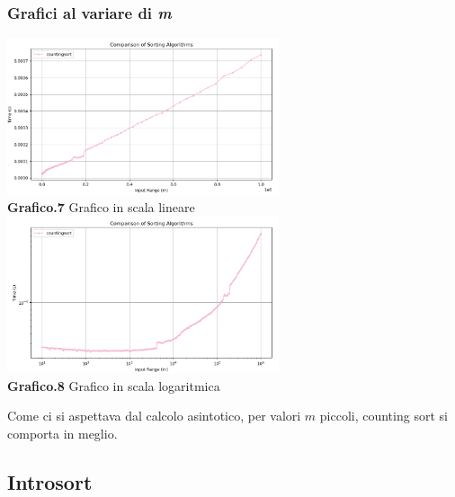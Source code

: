 \documentclass{article}
\begin{document}
        \subsubsection{Grafici al variare di \textit{m}}
            \begin{center}
                \includegraphics[width=0.6\textwidth]{Countingsort_InputRange.png} \\
                \textbf{Grafico.7} Grafico in scala lineare\\
                \vspace{0.5cm}
                \includegraphics[width=0.6\textwidth]{Countingsort_InputRange_Log.png} \\
                \textbf{Grafico.8} Grafico in scala logaritmica\\
            \end{center}
            Come ci si aspettava dal calcolo asintotico, per valori $m$ piccoli, counting sort si comporta in meglio.
    
    \subsection{Introsort}
\end{document}
